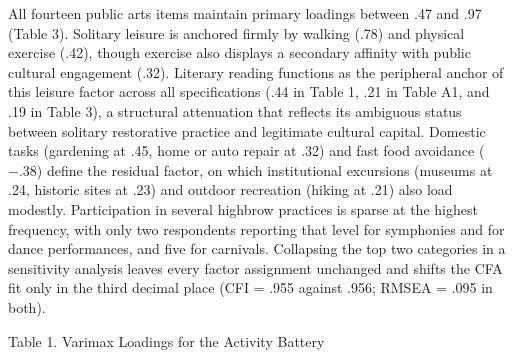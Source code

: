\documentclass[
  12pt
]{article}
\begin{document}
All fourteen public arts items maintain primary loadings between .47 and .97 (Table 3). Solitary leisure is anchored firmly by walking (.78) and physical exercise (.42), though exercise also displays a secondary affinity with public cultural engagement (.32). Literary reading functions as the peripheral anchor of this leisure factor across all specifications (.44 in Table 1, .21 in Table A1, and .19 in Table 3), a structural attenuation that reflects its ambiguous status between solitary restorative practice and legitimate cultural capital. Domestic tasks (gardening at .45, home or auto repair at .32) and fast food avoidance ($-.38$) define the residual factor, on which institutional excursions (museums at .24, historic sites at .23) and outdoor recreation (hiking at .21) also load modestly. Participation in several highbrow practices is sparse at the highest frequency, with only two respondents reporting that level for symphonies and for dance performances, and five for carnivals. Collapsing the top two categories in a sensitivity analysis leaves every factor assignment unchanged and shifts the CFA fit only in the third decimal place (CFI = .955 against .956; RMSEA = .095 in both).


Table 1. Varimax Loadings for the Activity Battery
\end{document}
